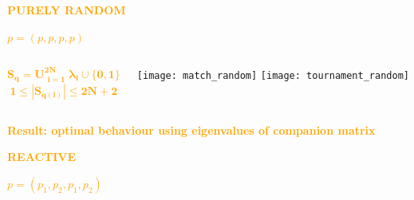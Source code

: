 \documentclass{beamer}
\begin{document}
\begin{frame}
    \begin{center}
    
    \end{center}
\end{frame}

\begin{frame}
    \begin{center}
    
    \end{center}
\end{frame}

\begin{frame}
    \begin{center}
    \Large{
    \textbf{\textcolor{orange}{PURELY RANDOM}} \vspace{1cm}

    \textcolor{orange}{\boldmath\( p = (p, p, p, p)\)}}
    \end{center}
\end{frame}

\begin{frame}
    \begin{columns}
        \begin{column}{.5\textwidth}
    \Large{\textcolor{orange}{
    \[\mathbf{S_q = U_{\substack{i=1}} ^ {2N} \lambda_i \cup \{0, 1\}}\] \vspace{1mm}
    \[\mathbf{1 \leq|S_{q(i)}| \leq 2N + 2}\]}}
        \end{column}
        \begin{column}{.5\textwidth}
            \texttt{[image: match\_random]}
            \texttt{[image: tournament\_random]}
        \end{column}
    \end{columns}
    \pause
    \centering
    \vspace{1cm}
    \textbf{\textcolor{orange}{Result: optimal behaviour using eigenvalues of companion matrix}}
\end{frame}

\begin{frame}
    \begin{center}
    \Large{
    \textbf{\textcolor{orange}{REACTIVE}} \vspace{1cm}

    \textcolor{orange}{\boldmath\( p = (p_1, p_2, p_1, p_2)\)}}
    \end{center}
\end{frame}
\end{document}
